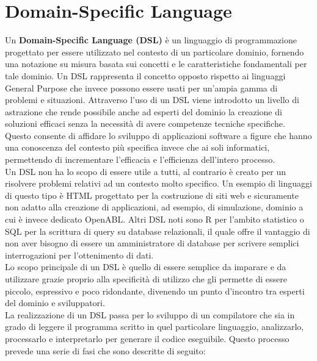 \section{Domain-Specific Language}
Un \textbf{Domain-Specific Language (DSL)} è un linguaggio di programmazione progettato per essere utilizzato nel contesto di un particolare dominio, fornendo una notazione su misura basata sui concetti e le caratteristiche fondamentali per tale dominio. Un DSL rappresenta il concetto opposto rispetto ai linguaggi General Purpose che invece possono essere usati per un’ampia gamma di problemi e situazioni. Attraverso l’uso di un DSL viene introdotto un livello di astrazione che rende possibile anche ad esperti del dominio la creazione di soluzioni efficaci senza la necessità di avere competenze tecniche specifiche. Questo consente di affidare lo sviluppo di applicazioni software a figure che hanno una conoscenza del contesto più specifica invece che ai soli informatici, permettendo di incrementare l'efficacia e l'efficienza dell'intero processo.\\
Un DSL non ha lo scopo di essere utile a tutti, al contrario è creato per un risolvere problemi relativi ad un contesto molto specifico. Un esempio di linguaggi di questo tipo è HTML progettato per la costruzione di siti web e sicuramente non adatto alla creazione di applicazioni, ad esempio, di simulazione, dominio a cui è invece dedicato OpenABL. Altri DSL noti sono R per l’ambito statistico o SQL per la scrittura di query su database relazionali, il quale offre il vantaggio di non aver bisogno di essere un amministratore di database per scrivere semplici interrogazioni per l'ottenimento di dati. \\
Lo scopo principale di un DSL è quello di essere semplice da imparare e da utilizzare grazie proprio alla specificità di utilizzo che gli permette di essere piccolo, espressivo e poco ridondante, divenendo un punto d’incontro tra esperti del dominio e sviluppatori. \\
La realizzazione di un DSL passa per lo sviluppo di un compilatore che sia in grado di leggere il programma scritto in quel particolare linguaggio, analizzarlo, processarlo e interpretarlo per generare il codice eseguibile. Questo processo prevede una serie di fasi che sono descritte di seguito:

